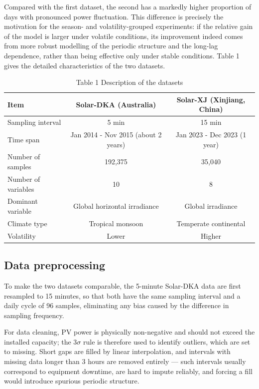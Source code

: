 \documentclass{iopjournal}
\begin{document}
Compared with the first dataset, the second has a markedly higher proportion of days with pronounced power fluctuation. This difference is precisely the motivation for the season- and volatility-grouped experiments: if the relative gain of the model is larger under volatile conditions, its improvement indeed comes from more robust modelling of the periodic structure and the long-lag dependence, rather than being effective only under stable conditions. Table 1 gives the detailed characteristics of the two datasets.

\begin{table}[htbp]
\caption{Table 1  Description of the datasets}
\centering
\begin{tabular}{l c c}
\hline
Item & Solar-DKA (Australia) & Solar-XJ (Xinjiang, China) \\
\hline
Sampling interval & 5 min & 15 min \\
Time span & Jan 2014 - Nov 2015 (about 2 years) & Jan 2023 - Dec 2023 (1 year) \\
Number of samples & 192,375 & 35,040 \\
Number of variables & 10 & 8 \\
Dominant variable & Global horizontal irradiance & Global irradiance \\
Climate type & Tropical monsoon & Temperate continental \\
Volatility & Lower & Higher \\
\hline
\end{tabular}
\label{tab1}
\end{table}

\subsection{Data preprocessing}

To make the two datasets comparable, the 5-minute Solar-DKA data are first resampled to 15 minutes, so that both have the same sampling interval and a daily cycle of 96 samples, eliminating any bias caused by the difference in sampling frequency.

For data cleaning, PV power is physically non-negative and should not exceed the installed capacity; the 3$\sigma$ rule is therefore used to identify outliers, which are set to missing. Short gaps are filled by linear interpolation, and intervals with missing data longer than 3 hours are removed entirely --- such intervals usually correspond to equipment downtime, are hard to impute reliably, and forcing a fill would introduce spurious periodic structure.
\end{document}
